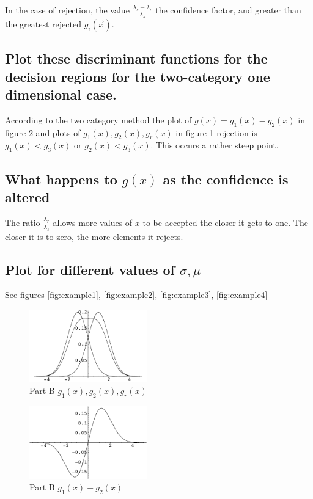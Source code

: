 \documentclass[11pt]{article}
\begin{document}
In the case of rejection, the value $\frac{\lambda_s - \lambda_r}{\lambda_s}$ the confidence factor, and greater than the greatest rejected $g_i(\vec{x})$.

\subsection{Plot these discriminant functions for the decision regions for the two-category one dimensional case.}

According to the two category method the plot of 
$g(x) = g_1(x) - g_2(x)$ in figure \ref{fig:exampleb2}  and plots of $g_1(x), g_2(x), g_r(x)$ in figure \ref{fig:exampleb1}
rejection is $g_1(x) < g_3(x)$ or $g_2(x) < g_3(x)$.  This occurs a rather steep point. 

\subsection{What happens to $g(x)$ as the confidence is altered}
The ratio $\frac{\lambda_r}{\lambda_s}$ allows more values of $x$ to be accepted the closer it gets to one.   The closer it is to zero, the more elements it rejects.  


\subsection{Plot for different values of $\sigma, \mu$}
See figures \ref{fig:example1}, \ref{fig:example2}, \ref{fig:example3}, \ref{fig:example4}

\begin{figure}[htbp] %
   \centering
   \includegraphics[width=2in]{partB_gr4.pdf} 
   \caption{Part B  $g_1(x), g_2(x), g_r(x)$}
   \label{fig:exampleb1}
\end{figure}


\begin{figure}[htbp] %
   \centering
   \includegraphics[width=2in]{partB_gr6.pdf} 
   \caption{Part B $g_1(x) - g_2(x)$}
   \label{fig:exampleb2}
\end{figure}
\end{document}
